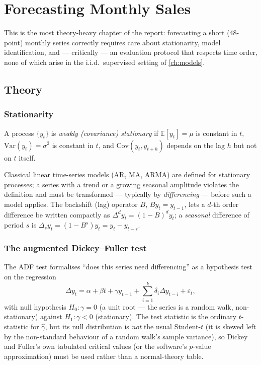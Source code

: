 \chapter{Forecasting Monthly Sales}
\label{ch:forecasting}

This is the most theory-heavy chapter of the report: forecasting a short
(48-point) monthly series correctly requires care about stationarity,
model identification, and — critically — an evaluation protocol that
respects time order, none of which arise in the i.i.d.\ supervised setting
of \cref{ch:models}.

\section{Theory}

\subsection{Stationarity}
\begin{definition}
A process $\{y_t\}$ is \emph{weakly (covariance) stationary} if
$\mathbb{E}[y_t] = \mu$ is constant in $t$, $\mathrm{Var}(y_t)=\sigma^2$
is constant in $t$, and $\mathrm{Cov}(y_t, y_{t+h})$ depends on the lag
$h$ but not on $t$ itself.
\end{definition}
Classical linear time-series models (AR, MA, ARMA) are defined for
stationary processes; a series with a trend or a growing seasonal
amplitude violates the definition and must be transformed — typically by
\emph{differencing} — before such a model applies. The backshift (lag)
operator $B$, $By_t = y_{t-1}$, lets a $d$-th order difference be written
compactly as $\Delta^d y_t = (1-B)^d y_t$; a \emph{seasonal} difference of
period $s$ is $\Delta_s y_t = (1-B^s) y_t = y_t - y_{t-s}$.

\subsection{The augmented Dickey--Fuller test}
The ADF test formalises ``does this series need differencing'' as a
hypothesis test on the regression
\begin{equation}
  \Delta y_t = \alpha + \beta t + \gamma y_{t-1}
             + \sum_{i=1}^{k}\delta_i \Delta y_{t-i} + \varepsilon_t,
  \label{eq:adf}
\end{equation}
with null hypothesis $H_0: \gamma = 0$ (a unit root — the series is a
random walk, non-stationary) against $H_1: \gamma < 0$ (stationary). The
test statistic is the ordinary $t$-statistic for $\hat\gamma$, but its
null distribution is \emph{not} the usual Student-$t$ (it is skewed left
by the non-standard behaviour of a random walk's sample variance), so
Dickey and Fuller's own tabulated critical values (or the software's
$p$-value approximation) must be used rather than a normal-theory table.

